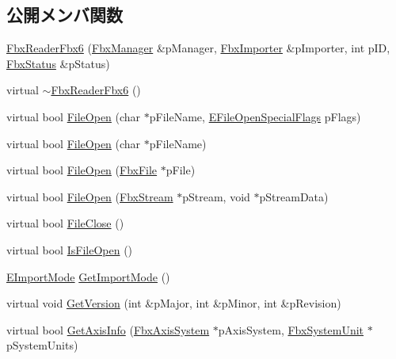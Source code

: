 \subsection*{公開メンバ関数}
\begin{DoxyCompactItemize}
\item 
\hyperlink{class_fbx_reader_fbx6_a0b5ae464b6a242ca8f06781f13e41787}{Fbx\+Reader\+Fbx6} (\hyperlink{class_fbx_manager}{Fbx\+Manager} \&p\+Manager, \hyperlink{class_fbx_importer}{Fbx\+Importer} \&p\+Importer, int p\+ID, \hyperlink{class_fbx_status}{Fbx\+Status} \&p\+Status)
\item 
virtual \hyperlink{class_fbx_reader_fbx6_a08f5cd1b6db11492ff0363a649a1ae7b}{$\sim$\+Fbx\+Reader\+Fbx6} ()
\item 
virtual bool \hyperlink{class_fbx_reader_fbx6_a9a28e37abe39c65e899a9c6f0b705756}{File\+Open} (char $\ast$p\+File\+Name, \hyperlink{class_fbx_reader_a1a14bd907bcda7dd48ba9b0a6236b7b8}{E\+File\+Open\+Special\+Flags} p\+Flags)
\item 
virtual bool \hyperlink{class_fbx_reader_fbx6_aae8a88d85353be67413ce60a27873422}{File\+Open} (char $\ast$p\+File\+Name)
\item 
virtual bool \hyperlink{class_fbx_reader_fbx6_a9f3d0e6b7722581f2028be9b94f1b933}{File\+Open} (\hyperlink{class_fbx_file}{Fbx\+File} $\ast$p\+File)
\item 
virtual bool \hyperlink{class_fbx_reader_fbx6_a841f736cd6203c124aba426b66559968}{File\+Open} (\hyperlink{class_fbx_stream}{Fbx\+Stream} $\ast$p\+Stream, void $\ast$p\+Stream\+Data)
\item 
virtual bool \hyperlink{class_fbx_reader_fbx6_a05230d40a8c8c2f62afee63f70a8d3be}{File\+Close} ()
\item 
virtual bool \hyperlink{class_fbx_reader_fbx6_a430304edb9e06837faacd6f25a0ed714}{Is\+File\+Open} ()
\item 
\hyperlink{class_fbx_reader_fbx6_ac6bc45d165880315e2657abf7ca16495}{E\+Import\+Mode} \hyperlink{class_fbx_reader_fbx6_aeafb8a0b4017c0d20630bc06ed4c08c4}{Get\+Import\+Mode} ()
\item 
virtual void \hyperlink{class_fbx_reader_fbx6_aad4206439b88a858608710d745bfd8e8}{Get\+Version} (int \&p\+Major, int \&p\+Minor, int \&p\+Revision)
\item 
virtual bool \hyperlink{class_fbx_reader_fbx6_ab8e2b6c8c2b0b081b615cd4969af32cb}{Get\+Axis\+Info} (\hyperlink{class_fbx_axis_system}{Fbx\+Axis\+System} $\ast$p\+Axis\+System, \hyperlink{class_fbx_system_unit}{Fbx\+System\+Unit} $\ast$p\+System\+Units)
\item 

\end{DoxyCompactItemize}
